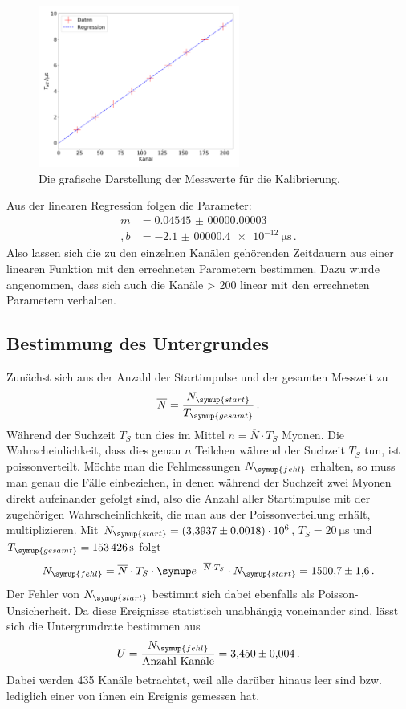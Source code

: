 \documentclass[
  bibliography=totoc,     %
  captions=tableheading,  %
  titlepage=firstiscover, %
]{scrartcl}
\begin{document}
\begin{figure}
  \centering
  \includegraphics[width=0.59\textwidth]{kal20.pdf}
  \caption{Die grafische Darstellung der Messwerte für die Kalibrierung.}
  \label{fig:3}
\end{figure}
\noindent
Aus der linearen Regression folgen die Parameter:
\begin{align}
  m &= \num{0.04545(0000000003)} \\ ,
  b &= \SI{-2.1(000004)e-12}{\micro\second} \, .
\end{align}
Also lassen sich die zu den einzelnen
Kanälen gehörenden Zeitdauern aus einer linearen Funktion mit den errechneten
Parametern bestimmen. Dazu wurde angenommen, dass sich auch die Kanäle > 200
linear mit den errechneten Parametern verhalten.
\subsection{Bestimmung des Untergrundes}
Zunächst sich aus der Anzahl der Startimpulse und der gesamten Messzeit zu
\begin{equation}
  \overline{N} = \frac{N_{\symup{start}}}{T_{\symup{gesamt}}} \, .
\end{equation}
Während der Suchzeit $T_S$ tun dies im Mittel $n = \overline{N} \cdot T_S$ Myonen.
Die Wahrscheinlichkeit, dass dies genau $n$ Teilchen während der Suchzeit $T_S$
tun, ist poissonverteilt. Möchte man die Fehlmessungen $N_{\symup{fehl}}$
erhalten, so muss man genau die Fälle einbeziehen, in denen während der Suchzeit
zwei Myonen direkt aufeinander gefolgt sind, also die Anzahl aller Startimpulse
mit der zugehörigen Wahrscheinlichkeit, die man aus der Poissonverteilung
erhält, multiplizieren.
Mit $N_{\symup{start}} = \num{3.3937(18)e6}$, $T_S = \SI{20}{\micro\second}$ und $T_{\symup{gesamt}}
= \SI{153426}{\second}$ folgt
\begin{equation}
  N_{\symup{fehl}} = \overline{N} \cdot T_S \cdot \symup e^{- \overline{N} \cdot T_S}
  \cdot N_{\symup{start}} = \num{1500.7(16)} \, .
\end{equation}
Der Fehler von $N_{\symup{start}}$ bestimmt sich dabei ebenfalls als Poisson-Unsicherheit.
Da diese Ereignisse statistisch unabhängig voneinander sind, lässt sich die Untergrundrate
bestimmen aus
\begin{equation}
  U = \frac{N_{\symup{fehl}}}{\text{Anzahl Kanäle}} = \num{3.450(4)} \, .
\end{equation}
Dabei werden 435 Kanäle betrachtet, weil alle darüber hinaus leer sind bzw. lediglich
einer von ihnen ein Ereignis gemessen hat.
\end{document}

